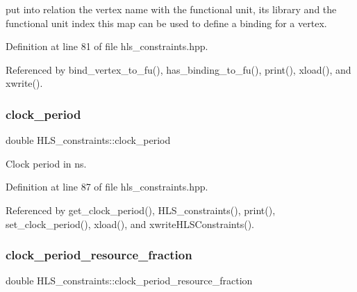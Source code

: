 put into relation the vertex name with the functional unit, its library and the functional unit index this map can be used to define a binding for a vertex. 



Definition at line 81 of file hls\+\_\+constraints.\+hpp.



Referenced by bind\+\_\+vertex\+\_\+to\+\_\+fu(), has\+\_\+binding\+\_\+to\+\_\+fu(), print(), xload(), and xwrite().

\mbox{\label{classHLS__constraints_a8645bf9e5ae984eefe022a4ab1d65aa7}} 
\subsubsection{\texorpdfstring{clock\+\_\+period}{clock\_period}}
{\footnotesize\ttfamily double H\+L\+S\+\_\+constraints\+::clock\+\_\+period\hspace{0.3cm}{\ttfamily [private]}}



Clock period in ns. 



Definition at line 87 of file hls\+\_\+constraints.\+hpp.



Referenced by get\+\_\+clock\+\_\+period(), H\+L\+S\+\_\+constraints(), print(), set\+\_\+clock\+\_\+period(), xload(), and xwrite\+H\+L\+S\+Constraints().

\mbox{\label{classHLS__constraints_a9b9d4a8f5e65a7164c52edfe92c52af7}} 
\subsubsection{\texorpdfstring{clock\+\_\+period\+\_\+resource\+\_\+fraction}{clock\_period\_resource\_fraction}}
{\footnotesize\ttfamily double H\+L\+S\+\_\+constraints\+::clock\+\_\+period\+\_\+resource\+\_\+fraction\hspace{0.3cm}{\ttfamily [private]}}



